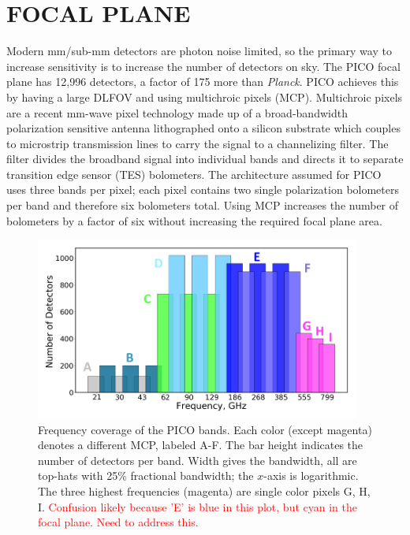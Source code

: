 \documentclass[]{spie}  %
\newcommand{\comr}[1]{\textcolor{red}{#1}}
\begin{document}
\section{FOCAL PLANE}
\label{sec:focalplane}

Modern mm/sub-mm detectors are photon noise limited, so the primary way to increase sensitivity is to increase the number of detectors on sky. 
The PICO focal plane has 12,996 detectors, a factor of 175 more than \textit{Planck}. PICO achieves this by having a large DLFOV and using 
multichroic pixels (MCP)\cite{Suzuki2014_samps}.  Multichroic pixels are a recent mm-wave pixel technology made up of a broad-bandwidth 
polarization sensitive antenna lithographed onto a silicon substrate which couples to microstrip transmission lines to carry the signal 
to a channelizing filter. The filter divides the broadband signal into individual bands and 
directs it to separate transition edge sensor (TES) bolometers. The architecture assumed for PICO uses three bands per pixel; each 
pixel contains two single polarization bolometers per band and therefore six bolometers total. Using MCP increases 
the number of bolometers by a factor of six without increasing the required focal plane area.  

\begin{figure} [ht]
\begin{center}
\includegraphics[height=6cm]{bands_label.png}
\end{center}
\caption { \label{fig:bands} 
Frequency coverage of the PICO bands. Each color (except magenta) denotes a different MCP, labeled A-F. The bar height 
indicates the number of detectors per band.  Width gives the bandwidth, all are top-hats with 
25\% fractional bandwidth; the $x$-axis is logarithmic.  The three highest frequencies (magenta) are single color pixels G, H, I.
\comr{Confusion likely because 'E' is blue in this plot, but cyan in the focal plane. Need to address this.}
}
\end{figure} 
\end{document}
